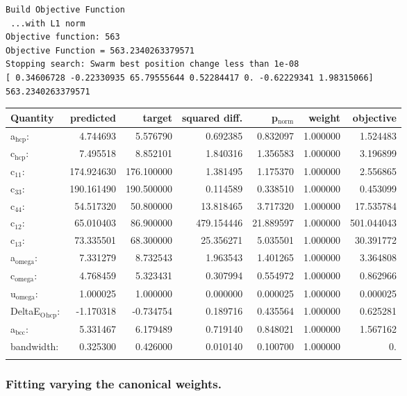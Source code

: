\documentclass[11pt]{article}
\begin{document}
\begin{verbatim}
Build Objective Function
 ...with L1 norm 
Objective function: 563 
Objective Function = 563.2340263379571 
Stopping search: Swarm best position change less than 1e-08 
[ 0.34606728 -0.22330935 65.79555644 0.52284417 0. -0.62229341 1.98315066] 
563.2340263379571
\end{verbatim}

\begin{center}
\begin{tabular}{lrrrrrr}
Quantity & predicted & target & squared diff. & p\(_{\text{norm}}\) & weight & objective\\
\hline
a\(_{\text{hcp}}\): & 4.744693 & 5.576790 & 0.692385 & 0.832097 & 1.000000 & 1.524483\\
c\(_{\text{hcp}}\): & 7.495518 & 8.852101 & 1.840316 & 1.356583 & 1.000000 & 3.196899\\
c\(_{\text{11}}\): & 174.924630 & 176.100000 & 1.381495 & 1.175370 & 1.000000 & 2.556865\\
c\(_{\text{33}}\): & 190.161490 & 190.500000 & 0.114589 & 0.338510 & 1.000000 & 0.453099\\
c\(_{\text{44}}\): & 54.517320 & 50.800000 & 13.818465 & 3.717320 & 1.000000 & 17.535784\\
c\(_{\text{12}}\): & 65.010403 & 86.900000 & 479.154446 & 21.889597 & 1.000000 & 501.044043\\
c\(_{\text{13}}\): & 73.335501 & 68.300000 & 25.356271 & 5.035501 & 1.000000 & 30.391772\\
a\(_{\text{omega}}\): & 7.331279 & 8.732543 & 1.963543 & 1.401265 & 1.000000 & 3.364808\\
c\(_{\text{omega}}\): & 4.768459 & 5.323431 & 0.307994 & 0.554972 & 1.000000 & 0.862966\\
u\(_{\text{omega}}\): & 1.000025 & 1.000000 & 0.000000 & 0.000025 & 1.000000 & 0.000025\\
DeltaE\(_{\text{O}}\)\(_{\text{hcp}}\): & -1.170318 & -0.734754 & 0.189716 & 0.435564 & 1.000000 & 0.625281\\
a\(_{\text{bcc}}\): & 5.331467 & 6.179489 & 0.719140 & 0.848021 & 1.000000 & 1.567162\\
bandwidth: & 0.325300 & 0.426000 & 0.010140 & 0.100700 & 1.000000 & 0.\\
 &  &  &  &  &  & \\
\end{tabular}
\end{center}
\subsubsection{Fitting varying the canonical weights.}
\label{sec:org28a005e}
\end{document}
